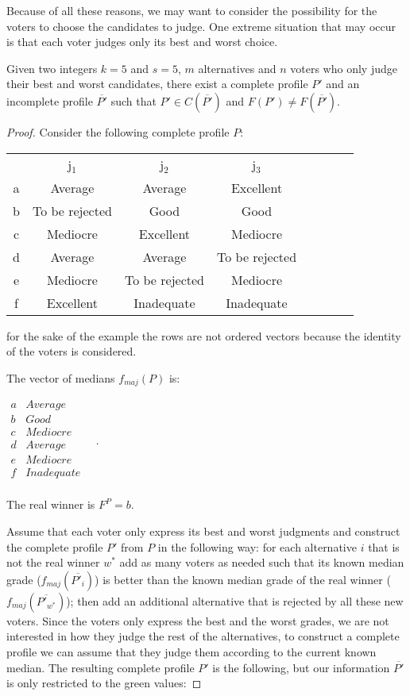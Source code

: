 \documentclass[version=3.21, pagesize, twoside=off, bibliography=totoc, DIV=calc, fontsize=12pt, a4paper]{scrartcl}
\begin{document}
Because of all these reasons, we may want to consider the possibility for the voters to choose the candidates to judge. One extreme situation that may occur is that each voter judges only its best and worst choice. 

\begin{proposition}
	Given two integers $k=5$ and $s=5$, $m$ alternatives and $n$ voters who only judge their best and worst candidates, there exist a complete profile $P'$ and an incomplete profile $\overline{P'}$ such that $P'\in C(\overline{P'})$ and $F(P')\neq F(\overline{P'})$.
\end{proposition}	

\begin{proof} Consider the following complete profile $P$:

	\begin{center}
		\begin{tabular}{cccccccc}
			& j$_1$ & j$_2$ & j$_3$ \\
			a	&	Average	&	Average	&	Excellent	\\
			b	&	To be rejected	&	Good	&	Good	\\
			c	&	Mediocre	&	Excellent	&	Mediocre	\\
			d	&	Average	&	Average	&	To be rejected	\\
			e	&	Mediocre	&	To be rejected	&	Mediocre	\\
			f	&	Excellent	&	Inadequate	&	Inadequate \\
		\end{tabular}
	\end{center}
	
	
	for the sake of the example the rows are not ordered vectors because the identity of the voters is considered.
	
	The vector of medians $f_{maj}(P)$ is:
	\begin{center}
		$
		\begin{array}{cc}
			a &	Average \\
			b &	Good \\
			c &	Mediocre \\
			d &	Average	\\
			e &	Mediocre \\
			f & Inadequate \\
		\end{array} \quad.
		$
	\end{center}
	The real winner is $F^P=b$. 
	
	Assume that each voter only express its best and worst judgments and construct the complete profile $P'$ from $P$ in the following way: for each alternative $i$ that is not the real winner $w^*$ add as many voters as needed such that its known median grade ($f_{maj}(\overline{P'_i})$) is better than the known median grade of the real winner ($f_{maj}(\overline{P'_{w^*}})$); then add an additional alternative that is rejected by all these new voters. Since the voters only express the best and the worst grades, we are not interested in how they judge the rest of the alternatives, to construct a complete profile we can assume that they judge them according to the current known median. The resulting complete profile $P'$ is the following, but our information $\overline{P'}$ is only restricted to the green values: 


\end{proof}
\end{document}
